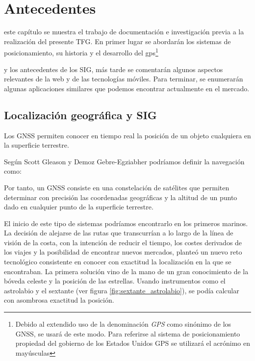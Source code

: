 \chapter{Antecedentes}
\label{chap:antecedentes}

 este capítulo se muestra el trabajo de documentación e investigación previa a la realización del presente \ac{TFG}. En primer lugar se abordarán los sistemas de posicionamiento, su historia y el desarrollo del gps\footnote{Debido al extendido uso de la denominación \textit{GPS} como sinónimo de los \ac{GNSS}, se usará de este modo. Para referirse al sistema de posicionamiento propiedad del gobierno de los Estados Unidos \acf{GPS} se utilizará el acrónimo en mayúsculas} 

y los antecedentes de los \ac{SIG}, más tarde se comentarán algunos aspectos relevantes de la web y de las tecnologías móviles. Para terminar, se enumerarán algunas aplicaciones similares que podemos encontrar actualmente en el mercado.

\section{Localización geográfica y \acf{SIG}}

Los \ac{GNSS} permiten conocer en tiempo real la posición de un objeto cualquiera en la superficie terrestre.

Según Scott Gleason y Demoz Gebre-Egziabher \cite{Glea09} podríamos definir la navegación como:

	\vspace{5mm}
	\vspace{5mm}

Por tanto, un \ac{GNSS} consiste en una constelación de satélites que permiten determinar con precisión las coordenadas geográficas y la altitud de un punto dado en cualquier punto de la superficie terrestre.

El inicio de este tipo de sistemas podríamos encontrarlo en los primeros marinos. La decisión de alejarse de las rutas que transcurrían a lo largo de la línea de visión de la costa, con la intención de reducir el tiempo, los costes derivados de los viajes y la posibilidad de encontrar nuevos mercados, planteó un nuevo reto tecnológico consistente en conocer con exactitud la localización en la que se encontraban.
La primera solución vino de la mano de un gran conocimiento de la bóveda celeste y la posición de las estrellas. Usando instrumentos como el astrolabio y el sextante (ver figura \ref{fig:sextante_astrolabio}), se podía calcular con asombrosa exactitud la posición.

